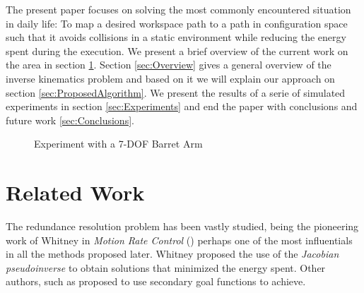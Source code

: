 \documentclass[conference]{IEEEtran}
\begin{document}
The present paper focuses on solving the most commonly encountered
situation in daily life: To map a desired workspace path to a path in
configuration space such that it avoids collisions in a static
environment while reducing the energy spent during the execution. We
present a brief overview of the current work on the area in section 
\ref{sec:RelatedWork}. Section \ref{sec:Overview} gives a general overview of
the inverse kinematics problem and based on it we will explain our
approach on section \ref{sec:ProposedAlgorithm}. We present the 
results of a serie of simulated experiments in section \ref{sec:Experiments}
and end the paper with conclusions and future work \ref{sec:Conclusions}.


\begin{figure}[]
  \centering
  \caption{ Experiment with a 7-DOF Barret Arm}
  \label{fig:CoverFigure}
\end{figure}


\section{Related Work}
\label{sec:RelatedWork}
The redundance resolution problem has been vastly studied, being the
pioneering work of Whitney in \emph{Motion Rate Control} (\cite{Whitney-motionRate-1969}) perhaps one of the most influentials in all the methods proposed later. 
Whitney proposed the use of the \emph{Jacobian pseudoinverse} to obtain
solutions that minimized the energy spent.  
Other authors, such as \cite{liegeois-ns-1977} proposed to use
secondary goal functions to achieve.
\end{document}
